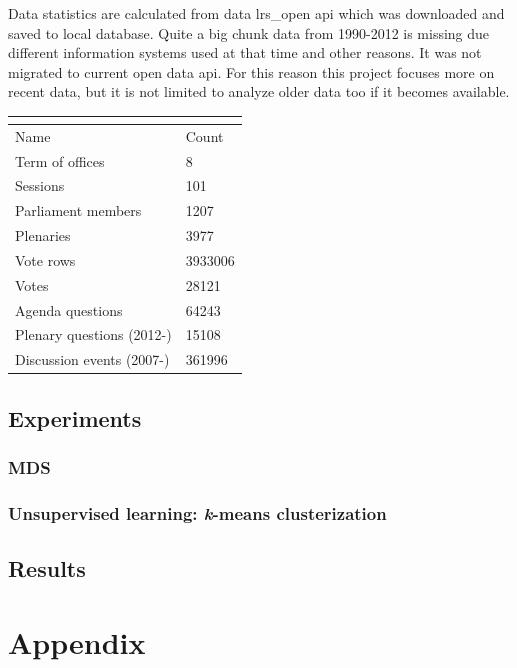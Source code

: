\documentclass[a4paper,12pt]{article}
\begin{document}
   	Data statistics are calculated from data \gls{lrs_open} \acrshort{api} which was downloaded and saved to local database. Quite a big chunk data from 1990-2012 is missing due different information systems used at that time and other reasons. It was not migrated to current open data \acrshort{api}. For this reason this project focuses more on recent data, but it is not limited to analyze older data too if it becomes available.
    
   	\noindent
    \begin{center}
    	\begin{tabular}{L{5cm} R{3cm}}
    		\\ 
    		\hline
    		Name & Count \\\hline
    		Term of offices & 8\\
    		Sessions & 101\\
    		Parliament members & 1207\\
    		Plenaries & 3977\\
    		Vote rows & 3933006\\
    		Votes & 28121\\
    		Agenda questions & 64243\\
    		Plenary questions (2012-) & 15108\\
    		Discussion events (2007-) & 361996\\
    		\hline
    	\end{tabular}
    	 \label{tab:data_statistics}
    \end{center}

    
    \hfill
    
    
   	\subsection{Experiments}
   	\subsubsection{MDS}
   	
   	
   	
   	
   	\subsubsection{Unsupervised learning: {\textit k-means} clusterization }
   	
   	\subsection{Results}
    
   
    \clearpage
    
    {}
    
        
    \clearpage
    
      
	\appendix
	\section{Appendix}
    
    
\end{document}
